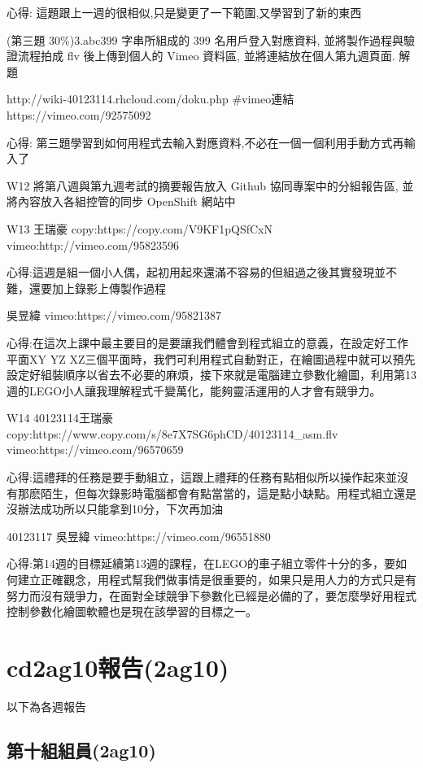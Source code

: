 \documentclass[]{article}
\begin{document}
心得: 這題跟上一週的很相似,只是變更了一下範圍,又學習到了新的東西

(第三題 30\%)3.abc399 字串所組成的 399 名用戶登入對應資料,
並將製作過程與驗證流程拍成 flv 後上傳到個人的 Vimeo 資料區,
並將連結放在個人第九週頁面. 解題

http://wiki-40123114.rhcloud.com/doku.php \#vimeo連結
https://vimeo.com/92575092

心得:
第三題學習到如何用程式去輸入對應資料,不必在一個一個利用手動方式再輸入了

W12 將第八週與第九週考試的摘要報告放入 Github 協同專案中的分組報告區,
並將內容放入各組控管的同步 OpenShift 網站中

W13 王瑞豪 copy:https://copy.com/V9KF1pQSfCxN
vimeo:http://vimeo.com/95823596

心得:這週是組一個小人偶，起初用起來還滿不容易的但組過之後其實發現並不難，還要加上錄影上傳製作過程

吳昱緯 vimeo:https://vimeo.com/95821387

心得:在這次上課中最主要目的是要讓我們體會到程式組立的意義，在設定好工作平面XY
YZ
XZ三個平面時，我們可利用程式自動對正，在繪圖過程中就可以預先設定好組裝順序以省去不必要的麻煩，接下來就是電腦建立參數化繪圖，利用第13週的LEGO小人讓我理解程式千變萬化，能夠靈活運用的人才會有競爭力。

W14 40123114王瑞豪
copy:https://www.copy.com/s/8e7X7SG6phCD/40123114\_asm.flv
vimeo:https://vimeo.com/96570659

心得:這禮拜的任務是要手動組立，這跟上禮拜的任務有點相似所以操作起來並沒有那麽陌生，但每次錄影時電腦都會有點當當的，這是點小缺點。用程式組立還是沒辦法成功所以只能拿到10分，下次再加油

40123117 吳昱緯 vimeo:https://vimeo.com/96551880

心得:第14週的目標延續第13週的課程，在LEGO的車子組立零件十分的多，要如何建立正確觀念，用程式幫我們做事情是很重要的，如果只是用人力的方式只是有努力而沒有競爭力，在面對全球競爭下參數化已經是必備的了，要怎麼學好用程式控制參數化繪圖軟體也是現在該學習的目標之一。

\section{cd2ag10報告(2ag10)}\label{cd2ag10ux5831ux544a2ag10}

以下為各週報告

\subsection{第十組組員(2ag10)}\label{ux7b2cux5341ux7d44ux7d44ux54e12ag10}
\end{document}
